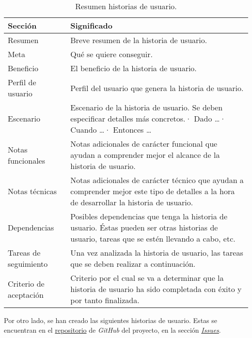 \begin{table}[H]
    \centering
    \def\arraystretch{1.25}
    \begin{adjustbox}{max width=\textwidth}
    \begin{tabularx}{\textwidth}{|l|L|}
    \hline
        \textbf{Sección} & \textbf{Significado} \\ \hline
    \hline
        Resumen & Breve resumen de la historia de usuario. \\ \hline
        Meta & Qué se quiere conseguir. \\ \hline
        Beneficio & El beneficio de la historia de usuario. \\ \hline
        Perfil de usuario & Perfil del usuario que genera la historia de usuario. \\ \hline
        Escenario & Escenario de la historia de usuario. Se deben especificar detalles más concretos.\linebreak · Dado …\linebreak · Cuando …\linebreak · Entonces … \\ \hline
        Notas funcionales & Notas adicionales de carácter funcional que ayudan a comprender mejor el alcance de la historia de usuario. \\ \hline
        Notas técnicas & Notas adicionales de carácter técnico que ayudan a comprender mejor este tipo de detalles a la hora de desarrollar la historia de usuario. \\ \hline
        Dependencias & Posibles dependencias que tenga la historia de usuario. Éstas pueden ser otras historias de usuario, tareas que se estén llevando a cabo, etc. \\ \hline
        Tareas de seguimiento & Una vez analizada la historia de usuario, las tareas que se deben realizar a continuación. \\ \hline
        Criterio de aceptación & Criterio por el cual se va a determinar que la historia de usuario ha sido completada con éxito y por tanto finalizada. \\ \hline
    \end{tabularx}
    \end{adjustbox}
    \caption{Resumen historias de usuario.}
\end{table}

\bigskip

Por otro lado, se han creado las siguientes historias de usuario. Estas se encuentran en el \href{https://github.com/harvestcore/matroos}{repositorio} de \textit{GitHub} del proyecto, en la sección \href{https://github.com/harvestcore/matroos/labels/US}{\textit{Issues}}.

